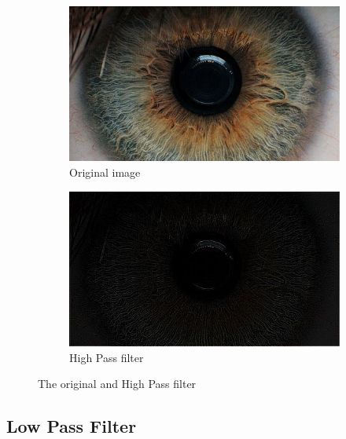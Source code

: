 \documentclass{article}
\begin{document}
%
%
\begin{figure}[H]
\centering

\begin{subfigure}{.5\textwidth}
  \centering
  \includegraphics[width=0.9\linewidth]{res/index.jpg}
  \caption{Original image}
  \label{fig:original_img}
\end{subfigure}%
\begin{subfigure}{.5\textwidth}
  \centering
  \includegraphics[width=0.9\linewidth]{res/high_pass.jpg}
  \caption{High Pass filter}
  \label{fig:gray_img}
\end{subfigure}

\caption{The original and High Pass filter}
\label{fig:result_high}
\end{figure}




\subsection{Low Pass Filter}
\end{document}
